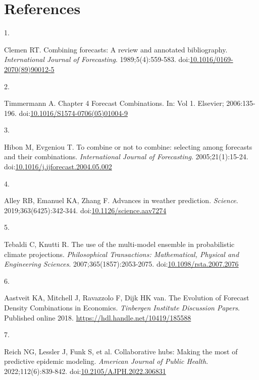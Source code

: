 \documentclass[
  letterpaper,
  DIV=11,
  numbers=noendperiod]{scrartcl}
\newlength{\cslhangindent}
\newlength{\csllabelwidth}
\newenvironment{CSLReferences}[2] %
 {\begin{list}{}{%
  \setlength{\itemindent}{0pt}
  \setlength{\leftmargin}{0pt}
  \setlength{\parsep}{0pt}
  \ifodd #1
   \setlength{\leftmargin}{\cslhangindent}
   \setlength{\itemindent}{-1\cslhangindent}
  \fi
  \setlength{\itemsep}{#2\baselineskip}}}
 {\end{list}}
\newcommand{\CSLLeftMargin}[1]{\parbox[t]{\csllabelwidth}{\strut#1\strut}}
\newcommand{\CSLRightInline}[1]{\parbox[t]{\linewidth - \csllabelwidth}{\strut#1\strut}}
\begin{document}
\section*{References}\label{references}

\label{refs}
\begin{CSLReferences}{0}{1}
\CSLLeftMargin{1. }%
\CSLRightInline{Clemen RT. Combining forecasts: A review and annotated
bibliography. \emph{International Journal of Forecasting}.
1989;5(4):559-583.
doi:\href{https://doi.org/10.1016/0169-2070(89)90012-5}{10.1016/0169-2070(89)90012-5}}

\CSLLeftMargin{2. }%
\CSLRightInline{Timmermann A. Chapter 4 Forecast Combinations. In: Vol
1. Elsevier; 2006:135-196.
doi:\href{https://doi.org/10.1016/S1574-0706(05)01004-9}{10.1016/S1574-0706(05)01004-9}}

\CSLLeftMargin{3. }%
\CSLRightInline{Hibon M, Evgeniou T. To combine or not to combine:
selecting among forecasts and their combinations. \emph{International
Journal of Forecasting}. 2005;21(1):15-24.
doi:\href{https://doi.org/10.1016/j.ijforecast.2004.05.002}{10.1016/j.ijforecast.2004.05.002}}

\CSLLeftMargin{4. }%
\CSLRightInline{Alley RB, Emanuel KA, Zhang F. Advances in weather
prediction. \emph{Science}. 2019;363(6425):342-344.
doi:\href{https://doi.org/10.1126/science.aav7274}{10.1126/science.aav7274}}

\CSLLeftMargin{5. }%
\CSLRightInline{Tebaldi C, Knutti R. The use of the multi-model ensemble
in probabilistic climate projections. \emph{Philosophical Transactions:
Mathematical, Physical and Engineering Sciences}.
2007;365(1857):2053-2075.
doi:\href{https://doi.org/10.1098/rsta.2007.2076}{10.1098/rsta.2007.2076}}

\CSLLeftMargin{6. }%
\CSLRightInline{Aastveit KA, Mitchell J, Ravazzolo F, Dijk HK van. The
Evolution of Forecast Density Combinations in Economics. \emph{Tinbergen
Institute Discussion Papers}. Published online 2018.
\url{https://hdl.handle.net/10419/185588}}

\CSLLeftMargin{7. }%
\CSLRightInline{Reich NG, Lessler J, Funk S, et al. Collaborative hubs:
Making the most of predictive epidemic modeling. \emph{American Journal
of Public Health}. 2022;112(6):839-842.
doi:\href{https://doi.org/10.2105/AJPH.2022.306831}{10.2105/AJPH.2022.306831}}


\end{CSLReferences}
\end{document}
